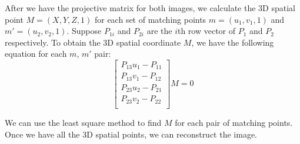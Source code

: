 After we have the projective matrix for both images, we calculate the 3D spatial point $M = (X, Y, Z, 1)$ for each set of matching points $m = (u_1, v_1, 1)$ and $m' = (u_2, v_2, 1)$. Suppose $P_{1i}$ and $P_{2i}$ are the $i$th row vector of $P_1$ and $P_2$ respectively. To obtain the 3D spatial coordinate $M$, we have the following equation for each $m$, $m'$ pair:
\begin{equation*}
  \left[ {\begin{array}{c}
   P_{13}u_1 - P_{11} \\
   P_{13}v_1 - P_{12} \\
   P_{23}u_2 - P_{21} \\
   P_{23}v_2 - P_{22} \\
  \end{array} } \right] M = 0
\end{equation*}

We can use the least square method to find $M$ for each pair of matching points. Once we have all the 3D spatial points, we can reconstruct the image.